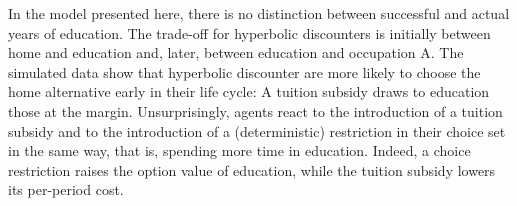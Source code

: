 In the model presented here, there is no distinction between successful and actual years of education. The trade-off for hyperbolic discounters is initially between home and education and, later, between education and occupation A. The simulated data show that hyperbolic discounter are more likely to choose the home alternative early in their life cycle: A tuition subsidy draws to education those at the margin. 
Unsurprisingly, agents react to the introduction of a tuition subsidy and to the introduction of a (deterministic) restriction in their choice set in the same way, that is, spending more time in education. Indeed, a choice restriction raises the option value of education, while the tuition subsidy lowers its per-period cost. 